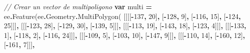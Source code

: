 \documentclass[
  12pt,
  letterpaper,
  twoside]{book}
\newenvironment{Shaded}{\begin{snugshade}}{\end{snugshade}}
\newcommand{\AttributeTok}[1]{\textcolor[rgb]{0.77,0.63,0.00}{#1}}
\newcommand{\CommentTok}[1]{\textcolor[rgb]{0.56,0.35,0.01}{\textit{#1}}}
\newcommand{\DecValTok}[1]{\textcolor[rgb]{0.00,0.00,0.81}{#1}}
\newcommand{\FunctionTok}[1]{\textcolor[rgb]{0.00,0.00,0.00}{#1}}
\newcommand{\KeywordTok}[1]{\textcolor[rgb]{0.13,0.29,0.53}{\textbf{#1}}}
\newcommand{\NormalTok}[1]{#1}
\newcommand{\OperatorTok}[1]{\textcolor[rgb]{0.81,0.36,0.00}{\textbf{#1}}}
\begin{document}
\begin{Shaded}
\begin{Highlighting}[]
\CommentTok{// Crear un vector de multipoligono}
\KeywordTok{var}\NormalTok{ multi }\OperatorTok{=}\NormalTok{ ee}\OperatorTok{.}\FunctionTok{Feature}\NormalTok{(ee}\OperatorTok{.}\AttributeTok{Geometry}\OperatorTok{.}\FunctionTok{MultiPolygon}\NormalTok{(}
\NormalTok{            [[[[}\OperatorTok{{-}}\DecValTok{137}\OperatorTok{,} \DecValTok{20}\NormalTok{]}\OperatorTok{,}
\NormalTok{               [}\OperatorTok{{-}}\DecValTok{128}\OperatorTok{,} \DecValTok{9}\NormalTok{]}\OperatorTok{,}
\NormalTok{               [}\OperatorTok{{-}}\DecValTok{116}\OperatorTok{,} \DecValTok{15}\NormalTok{]}\OperatorTok{,}
\NormalTok{               [}\OperatorTok{{-}}\DecValTok{124}\OperatorTok{,} \DecValTok{25}\NormalTok{]]]}\OperatorTok{,}
\NormalTok{             [[[}\OperatorTok{{-}}\DecValTok{123}\OperatorTok{,} \DecValTok{28}\NormalTok{]}\OperatorTok{,}
\NormalTok{               [}\OperatorTok{{-}}\DecValTok{129}\OperatorTok{,} \DecValTok{30}\NormalTok{]}\OperatorTok{,}
\NormalTok{               [}\OperatorTok{{-}}\DecValTok{139}\OperatorTok{,} \DecValTok{5}\NormalTok{]]]}\OperatorTok{,}
\NormalTok{             [[[}\OperatorTok{{-}}\DecValTok{113}\OperatorTok{,} \DecValTok{19}\NormalTok{]}\OperatorTok{,}
\NormalTok{               [}\OperatorTok{{-}}\DecValTok{143}\OperatorTok{,} \DecValTok{18}\NormalTok{]}\OperatorTok{,}
\NormalTok{               [}\OperatorTok{{-}}\DecValTok{123}\OperatorTok{,} \DecValTok{4}\NormalTok{]]]}\OperatorTok{,}
\NormalTok{             [[[}\OperatorTok{{-}}\DecValTok{133}\OperatorTok{,} \DecValTok{1}\NormalTok{]}\OperatorTok{,}
\NormalTok{               [}\OperatorTok{{-}}\DecValTok{118}\OperatorTok{,} \DecValTok{2}\NormalTok{]}\OperatorTok{,}
\NormalTok{               [}\OperatorTok{{-}}\DecValTok{116}\OperatorTok{,} \DecValTok{24}\NormalTok{]]]}\OperatorTok{,}
\NormalTok{             [[[}\OperatorTok{{-}}\DecValTok{109}\OperatorTok{,} \DecValTok{5}\NormalTok{]}\OperatorTok{,}
\NormalTok{               [}\OperatorTok{{-}}\DecValTok{103}\OperatorTok{,} \DecValTok{10}\NormalTok{]}\OperatorTok{,}
\NormalTok{               [}\OperatorTok{{-}}\DecValTok{147}\OperatorTok{,} \DecValTok{9}\NormalTok{]]]}\OperatorTok{,}
\NormalTok{             [[[}\OperatorTok{{-}}\DecValTok{110}\OperatorTok{,} \DecValTok{14}\NormalTok{]}\OperatorTok{,}
\NormalTok{               [}\OperatorTok{{-}}\DecValTok{160}\OperatorTok{,} \DecValTok{12}\NormalTok{]}\OperatorTok{,}
\NormalTok{               [}\OperatorTok{{-}}\DecValTok{161}\OperatorTok{,} \DecValTok{7}\NormalTok{]]]}\OperatorTok{,}

\end{Highlighting}
\end{Shaded}
\end{document}
